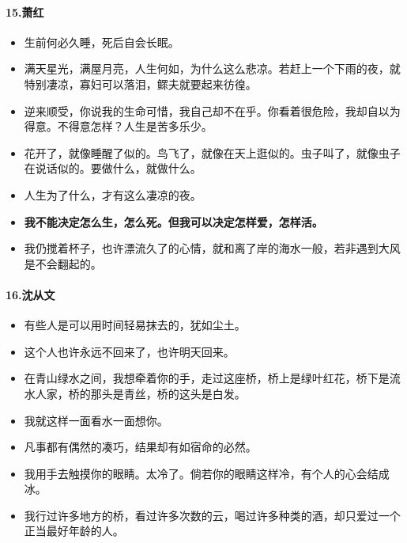 \documentclass[UTF8,a4paper,8pt]{ctexart}
\begin{document}
 \paragraph{15.萧红}
 \begin{itemize}
 	\item 生前何必久睡，死后自会长眠。
 	\item 满天星光，满屋月亮，人生何如，为什么这么悲凉。若赶上一个下雨的夜，就特别凄凉，寡妇可以落泪，鳏夫就要起来彷徨。
 	\item 逆来顺受，你说我的生命可惜，我自己却不在乎。你看着很危险，我却自以为得意。不得意怎样？人生是苦多乐少。
 	\item 花开了，就像睡醒了似的。鸟飞了，就像在天上逛似的。虫子叫了，就像虫子在说话似的。要做什么，就做什么。
 	\item 人生为了什么，才有这么凄凉的夜。
 	\item \textbf{我不能决定怎么生，怎么死。但我可以决定怎样爱，怎样活。}
 	\item 我仍搅着杯子，也许漂流久了的心情，就和离了岸的海水一般，若非遇到大风是不会翻起的。
 \end{itemize}	
 
 \paragraph{16.沈从文}
 \begin{itemize}
 	\item 有些人是可以用时间轻易抹去的，犹如尘土。
 	\item 这个人也许永远不回来了，也许明天回来。
 	\item 在青山绿水之间，我想牵着你的手，走过这座桥，桥上是绿叶红花，桥下是流水人家，桥的那头是青丝，桥的这头是白发。
 	\item 我就这样一面看水一面想你。
 	\item 凡事都有偶然的凑巧，结果却有如宿命的必然。
 	\item 我用手去触摸你的眼睛。太冷了。倘若你的眼睛这样冷，有个人的心会结成冰。
 	\item 我行过许多地方的桥，看过许多次数的云，喝过许多种类的酒，却只爱过一个正当最好年龄的人。
 \end{itemize}	
\end{document}
